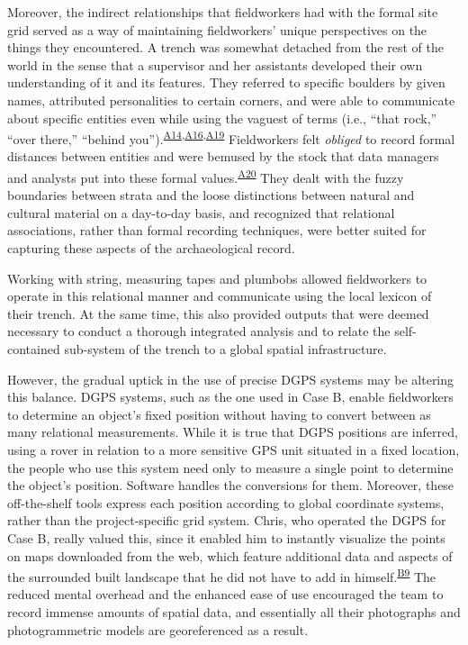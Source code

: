 \documentclass[
]{article}
\begin{document}
Moreover, the indirect relationships that fieldworkers had with the
formal site grid served as a way of maintaining fieldworkers' unique
perspectives on the things they encountered. A trench was somewhat
detached from the rest of the world in the sense that a supervisor and
her assistants developed their own understanding of it and its features.
They referred to specific boulders by given names, attributed
personalities to certain corners, and were able to communicate about
specific entities even while using the vaguest of terms (i.e., ``that
rock,'' ``over there,'' ``behind
you'').\textsuperscript{\hyperref[sec-A14]{A14},\hyperref[sec-A16]{A16},\hyperref[sec-A19]{A19}}
Fieldworkers felt \emph{obliged} to record formal distances between
entities and were bemused by the stock that data managers and analysts
put into these formal values.\textsuperscript{\hyperref[sec-A20]{A20}}
They dealt with the fuzzy boundaries between strata and the loose
distinctions between natural and cultural material on a day-to-day
basis, and recognized that relational associations, rather than formal
recording techniques, were better suited for capturing these aspects of
the archaeological record.

Working with string, measuring tapes and plumbobs allowed fieldworkers
to operate in this relational manner and communicate using the local
lexicon of their trench. At the same time, this also provided outputs
that were deemed necessary to conduct a thorough integrated analysis and
to relate the self-contained sub-system of the trench to a global
spatial infrastructure.

However, the gradual uptick in the use of precise DGPS systems may be
altering this balance. DGPS systems, such as the one used in Case B,
enable fieldworkers to determine an object's fixed position without
having to convert between as many relational measurements. While it is
true that DGPS positions are inferred, using a rover in relation to a
more sensitive GPS unit situated in a fixed location, the people who use
this system need only to measure a single point to determine the
object's position. Software handles the conversions for them. Moreover,
these off-the-shelf tools express each position according to global
coordinate systems, rather than the project-specific grid system. Chris,
who operated the DGPS for Case B, really valued this, since it enabled
him to instantly visualize the points on maps downloaded from the web,
which feature additional data and aspects of the surrounded built
landscape that he did not have to add in
himself.\textsuperscript{\hyperref[sec-B9]{B9}} The reduced mental
overhead and the enhanced ease of use encouraged the team to record
immense amounts of spatial data, and essentially all their photographs
and photogrammetric models are georeferenced as a result.
\end{document}
